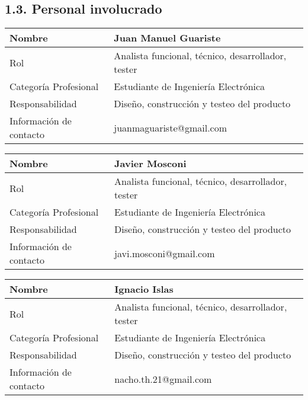 \documentclass{article} %
\begin{document}
\noindent 

\noindent 

\noindent \eject 

\noindent 
\subsection{1.3. Personal involucrado}

\noindent 

\begin{tabular}{|p{1.3in}|p{2.4in}|} \hline 
Nombre &  Juan Manuel Guariste \\ \hline 
Rol &  Analista funcional, t\'{e}cnico, desarrollador,    tester \\ \hline 
Categor\'{i}a Profesional &  Estudiante de Ingenier\'{i}a Electr\'{o}nica \\ \hline 
Responsabilidad &  Dise\~{n}o, construcci\'{o}n y testeo del producto \\ \hline 
Informaci\'{o}n de contacto &  juanmaguariste@gmail.com \\ \hline 
\end{tabular}

\textbf{}

\noindent 

\noindent 

\begin{tabular}{|p{1.3in}|p{2.4in}|} \hline 
Nombre &  Javier Mosconi \\ \hline 
Rol &  Analista funcional, t\'{e}cnico, desarrollador, tester \\ \hline 
Categor\'{i}a Profesional &  Estudiante de Ingenier\'{i}a Electr\'{o}nica \\ \hline 
Responsabilidad &  Dise\~{n}o, construcci\'{o}n y testeo del producto \\ \hline 
Informaci\'{o}n de contacto &  javi.mosconi@gmail.com \\ \hline 
\end{tabular}

\textbf{}

\noindent 

\noindent 

\begin{tabular}{|p{1.3in}|p{2.4in}|} \hline 
Nombre &  Ignacio Islas \\ \hline 
Rol &  Analista funcional, t\'{e}cnico, desarrollador,   tester \\ \hline 
Categor\'{i}a Profesional &  Estudiante de Ingenier\'{i}a Electr\'{o}nica \\ \hline 
Responsabilidad &  Dise\~{n}o, construcci\'{o}n y testeo del producto \\ \hline 
Informaci\'{o}n de contacto &  nacho.th.21@gmail.com \\ \hline 
\end{tabular}
\end{document}
